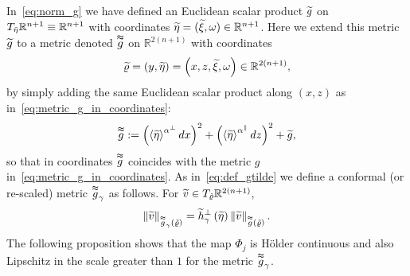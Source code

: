\documentclass[10pt]{amsart}
\theoremstyle{definition}\newtheorem{defi}[theo]{Definition}\newtheorem{rema}[theo]{Remark}\newtheorem{exam}[theo]{Example}\newtheorem{exem}[theo]{Example}\newtheorem{nota}[theo]{Notation}
\newcommand{\bbR}{\mathbb{R}}
\let\oldtilde\tilde
\renewcommand*{\tilde}[1]{\mathchoice{\widetilde{#1}}{\widetilde{#1}}{\oldtilde{#1}}{\oldtilde{#1}}}
\begin{document}
In~\eqref{eq:norm_g} we have defined an Euclidean scalar product $\tilde{g}$ on $T_{\tilde{\eta}}\bbR^{n+1}\equiv\bbR^{n+1}$ with coordinates $\tilde{\eta}=(\tilde{\xi},\omega)\in\bbR^{n+1}$. Here we extend this metric $\tilde{g}$ to a metric denoted $\overset{\thickapprox}{g}$ on $\bbR^{2\left(n+1\right)}$ with coordinates
\[
\tilde{\varrho}=\left(y,\tilde{\eta}\right)=\left(x,z,\tilde{\xi},\omega\right)\in\bbR^{2\left(n+1\right)},
\]
by simply adding the same Euclidean scalar product along $(x,z)$ as in~\eqref{eq:metric_g_in_coordinates}:
\begin{equation}\label{eq:def_g_double_tilde}
\overset{\thickapprox}{g}:=\left(\left\langle \tilde{\eta}\right\rangle ^{\alpha^{\perp}}dx\right)^{2}+\left(\left\langle \tilde{\eta}\right\rangle ^{\alpha^{\parallel}}dz\right)^{2}+\tilde{g},
\end{equation}
so that in coordinates $\overset{\thickapprox}{g}$ coincides with the metric $g$ in~\eqref{eq:metric_g_in_coordinates}. As in~\eqref{eq:def_gtilde} we define a conformal (or re-scaled) metric $\overset{\thickapprox}{g}_{\gamma}$ as follows. For $\tilde{v}\in T_{\tilde{\varrho}}\bbR^{2(n+1)}$,
\begin{equation}\label{eq:def_gtilde-1}
\left\Vert \tilde{v}\right\Vert _{\overset{\thickapprox}{g}_{\gamma}\left(\tilde{\varrho}\right)}=\tilde{h}_{\gamma}^{\perp}\left(\tilde{\eta}\right)\left\Vert \tilde{v}\right\Vert _{\overset{\thickapprox}{g}\left(\tilde{\varrho}\right)}.
\end{equation}
The following proposition shows that the map $\Phi_{j}$ is H\"older continuous and also Lipschitz in the scale greater than $1$ for the metric $\overset{\thickapprox}{g}_{\gamma}$.
\end{document}
